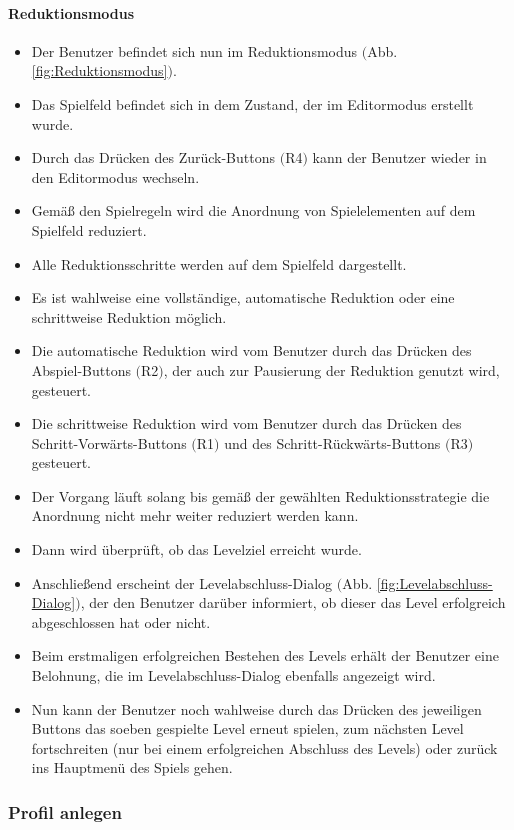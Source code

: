 \paragraph{Reduktionsmodus}
\begin{itemize}
	\item Der Benutzer befindet sich nun im Reduktionsmodus $($Abb. \ref{fig:Reduktionsmodus}$)$.
	\item Das Spielfeld befindet sich in dem Zustand, der im Editormodus erstellt wurde.
	\item Durch das Drücken des Zurück-Buttons $($R4$)$ kann der Benutzer wieder in den Editormodus wechseln.
	\item Gemäß den Spielregeln wird die Anordnung von Spielelementen auf dem Spielfeld reduziert.
	\item Alle Reduktionsschritte werden auf dem Spielfeld dargestellt.
	\item Es ist wahlweise eine vollständige, automatische Reduktion oder eine schrittweise Reduktion möglich.
	\item Die automatische Reduktion wird vom Benutzer durch das Drücken des Abspiel-Buttons $($R2$)$, der auch zur Pausierung der Reduktion genutzt wird, gesteuert.
	\item Die schrittweise Reduktion wird vom Benutzer durch das Drücken des Schritt-Vorwärts-Buttons $($R1$)$ und des Schritt-Rückwärts-Buttons $($R3$)$ gesteuert.
	\item Der Vorgang läuft solang bis gemäß der gewählten Reduktionsstrategie die Anordnung nicht mehr weiter reduziert werden kann.
	\item Dann wird überprüft, ob das Levelziel erreicht wurde.
	\item Anschließend erscheint der Levelabschluss-Dialog $($Abb. \ref{fig:Levelabschluss-Dialog}$)$, der den Benutzer darüber informiert, ob dieser das Level erfolgreich abgeschlossen hat oder nicht.
	\item Beim erstmaligen erfolgreichen Bestehen des Levels erhält der Benutzer eine Belohnung, die im Levelabschluss-Dialog ebenfalls angezeigt wird.
	\item Nun kann der Benutzer noch wahlweise durch das Drücken des jeweiligen Buttons das soeben gespielte Level erneut spielen, zum nächsten Level fortschreiten (nur bei einem erfolgreichen Abschluss des Levels) oder zurück ins Hauptmenü des Spiels gehen.
\end{itemize}

\subsubsection{Profil anlegen}
